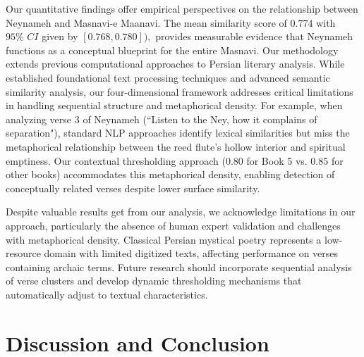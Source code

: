 \documentclass[twoside]{article}
\begin{document}
Our quantitative findings offer empirical perspectives on the relationship between Neynameh and Masnavi-e Maanavi. The mean similarity score of 
$0.774$ with $95\% \,\, CI$ given by $[0.768, 0.780]),$  provides measurable evidence that Neynameh functions as a conceptual blueprint for the entire Masnavi.
Our methodology extends previous computational approaches to Persian literary analysis. While \cite{Shamsfard:2011} established foundational text processing techniques and \cite{KarimiAhmadi:2022}
advanced semantic similarity analysis, our four-dimensional framework addresses critical limitations in handling sequential structure and metaphorical density.
 For example, when analyzing verse 3 of Neynameh (``Listen to the Ney, how it complains of separation"), standard NLP approaches identify lexical similarities but miss the metaphorical relationship between the reed flute's hollow interior and spiritual emptiness. Our contextual thresholding approach (0.80 for Book 5 vs. 0.85 for other books) accommodates this metaphorical density, enabling detection of conceptually related verses despite lower surface similarity. 


Despite valuable results get from our analysis, we  acknowledge limitations in our approach, particularly the absence of human expert validation and challenges with metaphorical density. 
Classical Persian mystical poetry represents a low-resource domain with limited digitized texts, affecting performance on verses containing archaic terms. Future research should incorporate sequential analysis of verse clusters and develop dynamic thresholding mechanisms that automatically adjust to textual characteristics.

						\section*{Discussion and Conclusion}   
\end{document}
